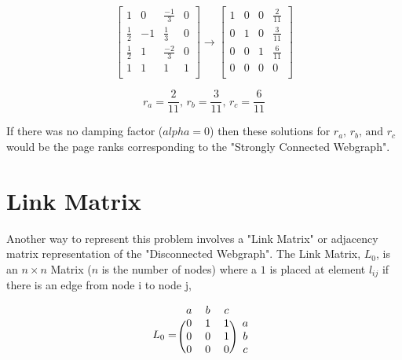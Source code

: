 \documentclass[12pt]{article}
\begin{document}
\[
\left[
\begin{array}{ccc|c}
1 			& 0 	& \frac{-1}{3} &  0 \\
\frac{1}{2} & -1 	& \frac{1}{3} &  0 \\
\frac{1}{2} & 1 	& \frac{-2}{3} &  0 \\
1 			& 1 	& 1 &  1 \\
\end{array}
\right]
%
%
\rightarrow
%
%
\left[
\begin{array}{ccc|c}
1 & 0 	& 0 &  \frac{2}{11} \\
0 & 1 	& 0 &  \frac{3}{11} \\
0 & 0 	& 1 &  \frac{6}{11} \\
0 & 0 	& 0 &  0 \\
\end{array}
\right]
\]

\begin{equation}
	\nonumber r_a = \frac{2}{11}, \, r_b = \frac{3}{11}, \, r_c = \frac{6}{11}
\end{equation}


\iffalse
$$
\begin{pmatrix} 
  1 	& 0 	& \frac{-1}{3}  \\
  0 	& 0 			& 1 		 \\
  \frac{1}{3} 	& \frac{1}{3} 	& \frac{1}{3}
\end{pmatrix}
$$
\fi



If there was no damping factor ($alpha=0$) then these solutions for $r_a, \, r_b, \, \text{and } r_c$ would be the page ranks corresponding to the "Strongly Connected Webgraph". 

\section{Link Matrix}

Another way to represent this problem involves a "Link Matrix" or adjacency matrix representation of the "Disconnected Webgraph". The Link Matrix, $L_0$, is an $n \times n$ Matrix ($n$ is the number of nodes) where a $1$ is placed at element $l_{ij}$ if there is an edge from node i to node j,

\[
L_0 =
\begin{blockarray}{cccc}
a & b & c \\
\begin{block}{(ccc)c}
  0 & 1 & 1 & a \\
  0 & 0 & 1 & b \\
  0 & 0 & 0 & c \\
\end{block}
\end{blockarray}
\]
\end{document}
